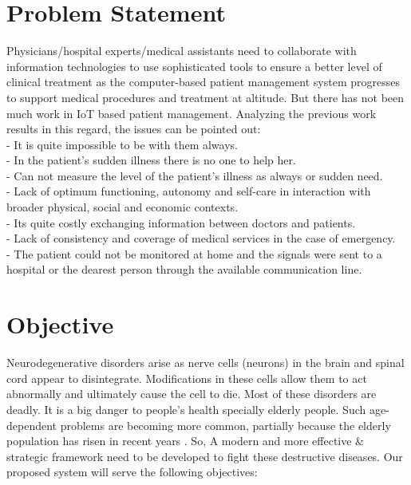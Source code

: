 


\section{Problem Statement}
Physicians/hospital experts/medical assistants need to collaborate with information technologies to use sophisticated tools to ensure a better level of clinical treatment as the computer-based patient management system progresses to support medical procedures and treatment at altitude. But there has not been much work in IoT based patient management. Analyzing the previous work results in this regard, the issues can be pointed out:\\
-	It is quite impossible to be with them always.\\
-	In the patient’s sudden illness there is no one to help her.\\
-	Can not measure the level of the patient's illness as always or sudden need.\\
-   Lack of optimum functioning, autonomy and self-care in interaction with broader physical, social and economic contexts.\\
-	Its quite costly exchanging information between doctors and patients.\\
-	Lack of consistency and coverage of medical services in the case of emergency.\\
-	The patient could not be monitored at home and the signals were sent to a hospital or the dearest person through the available communication line. 



\section{Objective}
Neurodegenerative disorders arise as nerve cells (neurons) in the brain and spinal cord appear to disintegrate. Modifications in these cells allow them to act abnormally and ultimately cause the cell to die. Most of these disorders are deadly. It is a big danger to people's health specially elderly people. Such age-dependent problems are becoming more common, partially because the elderly population has risen in recent years . So,  A modern and more effective \& strategic framework need to be developed to fight these destructive diseases. Our proposed system will serve the following objectives:



